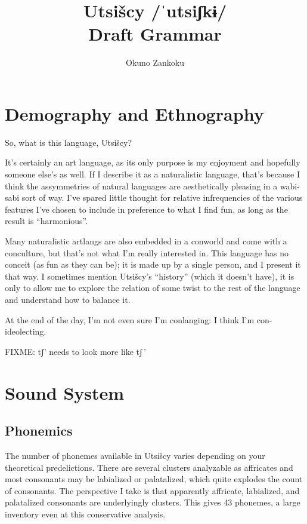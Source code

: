 \documentclass[12pt]{book} %
\title{Utsišcy /ˈutsiʃkɨ/ \\ {\Large Draft Grammar}}
\author{Okuno Zankoku}
\begin{document}
\maketitle





\chapter{Demography and Ethnography}
So, what is this language, Utsišcy?

It's certainly an art language, as its only purpose is my enjoyment and hopefully someone else's as well.
If I describe it as a naturalistic language, that's because I think the assymmetries of natural languages are aesthetically pleasing in a wabi-sabi sort of way.
I've spared little thought for relative infrequencies of the various features I've chosen to include in preference to what I find fun, as long as the result is ``harmonious''.

Many naturalistic artlangs are also embedded in a conworld and come with a conculture, but that's not what I'm really interested in.
This language has no conceit (as fun as they can be); it is made up by a single person, and I present it that way.
I sometimes mention Utsišcy's ``history'' (which it doesn't have), it is only to allow me to explore the relation of some twist to the rest of the language and understand how to balance it.

At the end of the day, I'm not even sure I'm conlanging: I think I'm con-ideolecting.


FIXME: tʃ' needs to look more like tʃ\,'


\chapter{Sound System}

\section{Phonemics}

The number of phonemes available in Utsišcy varies depending on your theoretical predelictions.
There are several clusters analyzable as affricates and most consonants may be labialized or palatalized, which quite explodes the count of consonants.
The perspective I take is that apparently affricate, labialized, and palatalized consonants are underlyingly clusters.
This gives 43 phonemes, a large inventory even at this conservative analysis.
\end{document}
